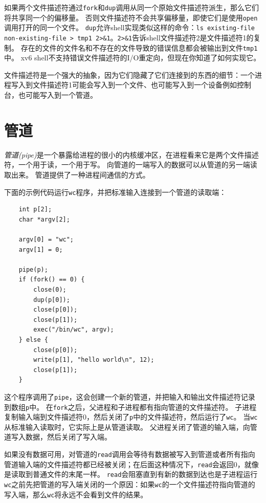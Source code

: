 如果两个文件描述符通过\texttt{fork}和\texttt{dup}调用从同一个原始文件描述符派生，那么它们将共享同一个的偏移量。
否则文件描述符不会共享偏移量，即使它们是使用\texttt{open}调用打开的同一个文件。
\texttt{dup}允许shell实现类似这样的命令：\texttt{ls existing-file non-existing-file > tmp1 2>\&1}。\texttt{2>\&1}告诉shell文件描述符2是文件描述符1的复制。
存在的文件的文件名和不存在的文件导致的错误信息都会被输出到文件\texttt{tmp1}中。
xv6 shell不支持错误文件描述符的I/O重定向，但现在你知道了如何实现它。

文件描述符是一个强大的抽象，因为它们隐藏了它们连接到的东西的细节：一个进程写入到文件描述符1可能会写入到一个文件、也可能写入到一个设备例如控制台，也可能写入到一个管道。

\section*{管道}
\emph{管道(pipe)}是一个暴露给进程的很小的内核缓冲区，在进程看来它是两个文件描述符，一个用于读，一个用于写。
向管道的一端写入的数据可以从管道的另一端读取出来。
管道提供了一种进程间通信的方式。

下面的示例代码运行\texttt{wc}程序，并把标准输入连接到一个管道的读取端：
\begin{lstlisting}
    int p[2];
    char *argv[2];

    argv[0] = "wc";
    argv[1] = 0;

    pipe(p);
    if (fork() == 0) {
        close(0);
        dup(p[0]);
        close(p[0]);
        close(p[1]);
        exec("/bin/wc", argv);
    } else {
        close(p[0]);
        write(p[1], "hello world\n", 12);
        close(p[1]);
    }
\end{lstlisting}

这个程序调用了\texttt{pipe}，这会创建一个新的管道，并把输入和输出文件描述符记录到数组\texttt{p}中。
在\texttt{fork}之后，父进程和子进程都有指向管道的文件描述符。
子进程复制输入端到文件描述符0，然后关闭了\texttt{p}中的文件描述符，然后运行了\texttt{wc}。
当\texttt{wc}从标准输入读取时，它实际上是从管道读取。
父进程关闭了管道的输入端，向管道写入数据，然后关闭了写入端。

如果没有数据可用，对管道的\texttt{read}调用会等待有数据被写入到管道或者所有指向管道输入端的文件描述符都已经被关闭；在后面这种情况下，\texttt{read}会返回0，就像是读取到普通文件的末尾一样。
\texttt{read}会阻塞直到有新的数据到达也是子进程运行\texttt{wc}之前先把管道的写入端关闭的一个原因：如果\texttt{wc}的一个文件描述符指向管道的写入端，那么\texttt{wc}将永远不会看到文件的结果。

